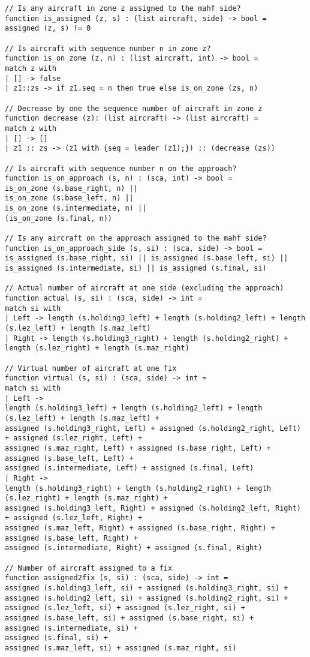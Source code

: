 \begin{verbatim}
// Is any aircraft in zone z assigned to the mahf side?
function is_assigned (z, s) : (list aircraft, side) -> bool = 
assigned (z, s) != 0

// Is aircraft with sequence number n in zone z?
function is_on_zone (z, n) : (list aircraft, int) -> bool = 
match z with
| [] -> false
| z1::zs -> if z1.seq = n then true else is_on_zone (zs, n)

// Decrease by one the sequence number of aircraft in zone z
function decrease (z): (list aircraft) -> (list aircraft) = 
match z with
| [] -> []
| z1 :: zs -> (z1 with {seq = leader (z1);}) :: (decrease (zs))

// Is aircraft with sequence number n on the approach?
function is_on_approach (s, n) : (sca, int) -> bool = 
is_on_zone (s.base_right, n) || 
is_on_zone (s.base_left, n) || 
is_on_zone (s.intermediate, n) || 
(is_on_zone (s.final, n))

// Is any aircraft on the approach assigned to the mahf side?
function is_on_approach_side (s, si) : (sca, side) -> bool = 
is_assigned (s.base_right, si) || is_assigned (s.base_left, si) || is_assigned (s.intermediate, si) || is_assigned (s.final, si)

// Actual number of aircraft at one side (excluding the approach)
function actual (s, si) : (sca, side) -> int = 
match si with
| Left -> length (s.holding3_left) + length (s.holding2_left) + length (s.lez_left) + length (s.maz_left)
| Right -> length (s.holding3_right) + length (s.holding2_right) + length (s.lez_right) + length (s.maz_right)

// Virtual number of aircraft at one fix
function virtual (s, si) : (sca, side) -> int = 
match si with
| Left -> 
length (s.holding3_left) + length (s.holding2_left) + length (s.lez_left) + length (s.maz_left) +
assigned (s.holding3_right, Left) + assigned (s.holding2_right, Left) + assigned (s.lez_right, Left) +
assigned (s.maz_right, Left) + assigned (s.base_right, Left) + assigned (s.base_left, Left) +
assigned (s.intermediate, Left) + assigned (s.final, Left)
| Right -> 
length (s.holding3_right) + length (s.holding2_right) + length (s.lez_right) + length (s.maz_right) +
assigned (s.holding3_left, Right) + assigned (s.holding2_left, Right) + assigned (s.lez_left, Right) +
assigned (s.maz_left, Right) + assigned (s.base_right, Right) + assigned (s.base_left, Right) +
assigned (s.intermediate, Right) + assigned (s.final, Right)

// Number of aircraft assigned to a fix
function assigned2fix (s, si) : (sca, side) -> int = 
assigned (s.holding3_left, si) + assigned (s.holding3_right, si) +
assigned (s.holding2_left, si) + assigned (s.holding2_right, si) +
assigned (s.lez_left, si) + assigned (s.lez_right, si) +
assigned (s.base_left, si) + assigned (s.base_right, si) +
assigned (s.intermediate, si) +
assigned (s.final, si) +
assigned (s.maz_left, si) + assigned (s.maz_right, si)


\end{verbatim}
